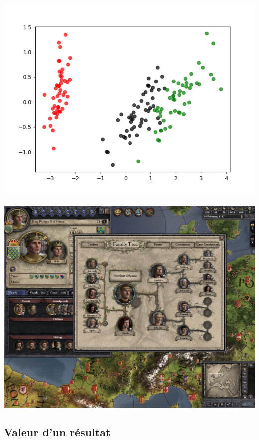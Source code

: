 \documentclass[11pt]{beamer}
\newenvironment{slide}[1]{%
\begin{frame}[environment=slide]
\frametitle{#1}
}{%
\end{frame}
}
\begin{document}
\begin{slide}{}

\includegraphics[scale=0.5]{A8classif}

\end{slide}

\begin{slide}{}

\includegraphics[scale=0.25]{A9videogames}

\end{slide}

\subsection{Valeur d'un résultat}
\end{document}
